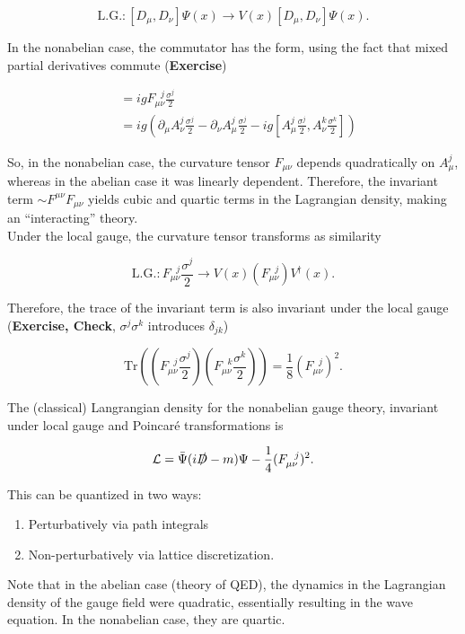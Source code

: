 \documentclass[10pt]{article}
\begin{document}
\begin{equation}
\text{L.G.}: [D_\mu, D_\nu] \Psi (x) \rightarrow V(x) [D_\mu, D_\nu] \Psi (x).
\end{equation}

\noindent In the nonabelian case, the commutator has the form, using the fact that mixed partial derivatives commute (\textbf{Exercise})

\begin{align}
[ D_\mu, D_\nu] &= i g F_{\mu\nu}^{\,\,\,\,j} \frac{\sigma^j}{2} \\
&= ig \left( \partial_\mu A_\nu^j \frac{\sigma^j}{2} - \partial_\nu A_\mu^j \frac{\sigma^j}{2} - i g \left[ A_\mu^j \frac{\sigma^j}{2}, A_\nu^k \frac{\sigma^k}{2} \right] \right)
\end{align}

\noindent So, in the nonabelian case, the curvature tensor $F_{\mu\nu}$ depends quadratically on $A_\mu^j$, whereas in the abelian case it was linearly dependent. Therefore, the invariant term $\sim F^{\mu\nu}F_{\mu\nu}$ yields cubic and quartic terms in the Lagrangian density, making an ``interacting'' theory. \\

\noindent Under the local gauge, the curvature tensor transforms as similarity

\begin{equation}
\text{L.G.}: F_{\mu\nu}^{\,\,\,\,j} \frac{\sigma^j}{2} \rightarrow V(x) (F_{\mu\nu}^{\,\,\,\,j}) V^\dagger (x).
\end{equation}

\noindent Therefore, the trace of the invariant term is also invariant under the local gauge (\textbf{Exercise, Check}, $\sigma^j \sigma^k$ introduces $\delta_{jk}$)

\begin{equation}
\text{Tr}\left( \left( F_{\mu\nu}^{\,\,\,\,j} \frac{\sigma^j}{2} \right)\left( F_{\mu\nu}^{\,\,\,\,k} \frac{\sigma^k}{2} \right) \right)= \frac{1}{8} (F_{\mu\nu}^{\,\,\,\,j})^2.
\end{equation}

\noindent The (classical) Langrangian density for the nonabelian gauge theory, invariant under local gauge and Poincar\'e transformations is

\begin{equation}
\mathcal{L} = \bar{\Psi} (i \slashed{D} - m) \Psi - \frac{1}{4} (F_{\mu\nu}^{\,\,\,\,j})^2.
\end{equation}

\noindent This can be quantized in two ways:

\begin{enumerate}
\item Perturbatively via path integrals
\item Non-perturbatively via lattice discretization.
\end{enumerate}

\noindent Note that in the abelian case (theory of QED), the dynamics in the Lagrangian density of the gauge field were quadratic, essentially resulting in the wave equation. In the nonabelian case, they are quartic.

%

\end{document}
